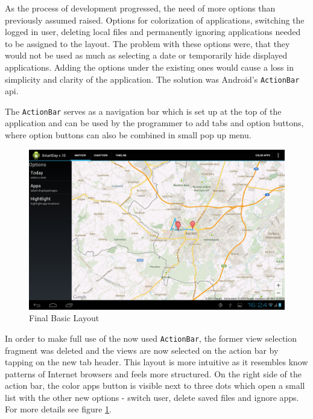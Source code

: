 As  the process of development progressed, the need of more options than previously assumed raised. Options for colorization of applications, switching the logged in user, deleting local files and permanently ignoring applications needed to be assigned to the layout. The problem with these options were, that they would not be used as much as selecting a date or temporarily hide displayed applications. Adding the options under the existing ones would cause a loss in simplicity and clarity of the application. The solution was Android's \lstinline{ActionBar} api.

The \lstinline{ActionBar} serves as a navigation bar which is set up at the top of the application and can be used by the programmer to add tabs and option buttons, where option buttons can also be combined in small pop up menu. 
\begin{figure}[h]
	\caption{Final Basic Layout}
	\label{img:finalbasiclayout}
	\includegraphics[width=\textwidth]{images/Screenshots/v10/Screenshot_2013-08-19-16-24-58.png}
\end{figure}

In  order to make full use of the now used \lstinline{ActionBar}, the former view selection fragment was deleted and the views are now selected on the action bar by tapping on the new tab header. This layout is more intuitive as it resembles know patterns of Internet browsers and feels more structured. On the right side of the action bar, the color apps button is visible next to three dots which open a small list with the other new options - switch user, delete saved files and ignore apps. For more details see figure \ref{img:finalbasiclayout}.

